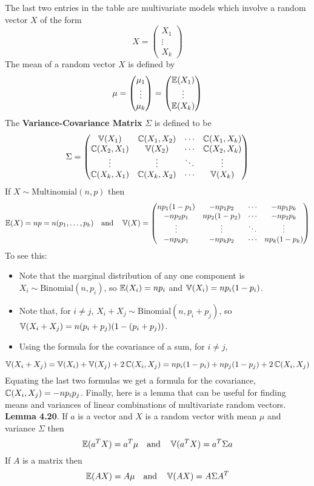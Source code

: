 The last two entries in the table are multivariate models which involve
a random vector \(X\) of the form
\[
X = \begin{pmatrix} X_{1} \\ \vdots \\ X_{k} \end{pmatrix}
\]
The mean of a random vector \(X\) is defined by
\[
\mu = \begin{pmatrix} \mu_{1} \\ \vdots \\ \mu_{k} \end{pmatrix} = \begin{pmatrix} \operatorname{\mathbb{E}}(X_{1}) \\ \vdots \\ \operatorname{\mathbb{E}}(X_{k}) \end{pmatrix}
\]
The \textbf{Variance-Covariance Matrix} \(\Sigma\) is defined to be
\[
\Sigma = \begin{pmatrix}
\operatorname{\mathbb{V}}(X_{1}) & \operatorname{\mathbb{C}}(X_{1}, X_{2}) & \cdots & \operatorname{\mathbb{C}}(X_{1}, X_{k}) \\
\operatorname{\mathbb{C}}(X_{2}, X_{1}) & \operatorname{\mathbb{V}}(X_{2}) & \cdots & \operatorname{\mathbb{C}}(X_{2}, X_{k}) \\
\vdots & \vdots & \ddots & \vdots \\
\operatorname{\mathbb{C}}(X_{k}, X_{1}) & \operatorname{\mathbb{C}}(X_{k}, X_{2}) & \cdots & \operatorname{\mathbb{V}}(X_{k})
\end{pmatrix}
\]
If \(X \sim \text{Multinomial}(n, p)\) then
\[
\operatorname{\mathbb{E}}(X) = np = n(p_{1}, \dots, p_{k})
\quad \text{and} \quad
\operatorname{\mathbb{V}}(X) = \begin{pmatrix}
np_{1}(1 - p_{1}) & -np_{1}p_{2} & \cdots & -np_{1}p_{k} \\
-np_{2}p_{1} & np_{2}(1 - p_{2}) & \cdots & -np_{2}p_{k} \\
\vdots & \vdots & \ddots & \vdots \\
-np_{k}p_{1} & -np_{k}p_{2} & \cdots & np_{k}(1 - p_{k})
\end{pmatrix}
\]
To see this:
\begin{itemize}[tightlist]
\item
  Note that the marginal distribution of any one component is
  \(X_{i} \sim \text{Binomial}(n, p_{i})\), so \(\operatorname{\mathbb{E}}(X_{i}) = np_{i}\)
  and \(\operatorname{\mathbb{V}}(X_{i}) = np_{i}(1 - p_{i})\).\\
\item
  Note that, for \(i \neq j\),
  \(X_{i} + X_{j} \sim \text{Binomial}(n, p_{i} + p_{j})\), so
  \(\operatorname{\mathbb{V}}(X_{i} + X_{j}) = n(p_{i} + p_{j})(1 - (p_{i} + p_{j}))\).
\item
  Using the formula for the covariance of a sum, for \(i \neq j\),
\end{itemize}
\[
\operatorname{\mathbb{V}}(X_{i} + X_{j}) = \operatorname{\mathbb{V}}(X_{i}) + \operatorname{\mathbb{V}}(X_{j}) + 2 \operatorname{\mathbb{C}}(X_{i}, X_{j}) =  np_{i}(1 - p_{i}) + np_{j}(1 - p_{j}) + 2 \operatorname{\mathbb{C}}(X_{i}, X_{j})
\]
Equating the last two formulas we get a formula for the covariance,
\(\operatorname{\mathbb{C}}(X_{i}, X_{j}) = -np_{i}p_{j}\).
Finally, here is a lemma that can be useful for finding means and
variances of linear combinations of multivariate random vectors.
\textbf{Lemma 4.20}. If \(a\) is a vector and \(X\) is a random vector
with mean \(\mu\) and variance \(\Sigma\) then
\[
\operatorname{\mathbb{E}}(a^T X) = a^T \mu
\quad \text{and} \quad
\operatorname{\mathbb{V}}(a^T X) = a^T \Sigma a
\]
If \(A\) is a matrix then
\[
\operatorname{\mathbb{E}}(A X) = A \mu
\quad \text{and} \quad
\operatorname{\mathbb{V}}(AX) = A \Sigma A^T
\]

